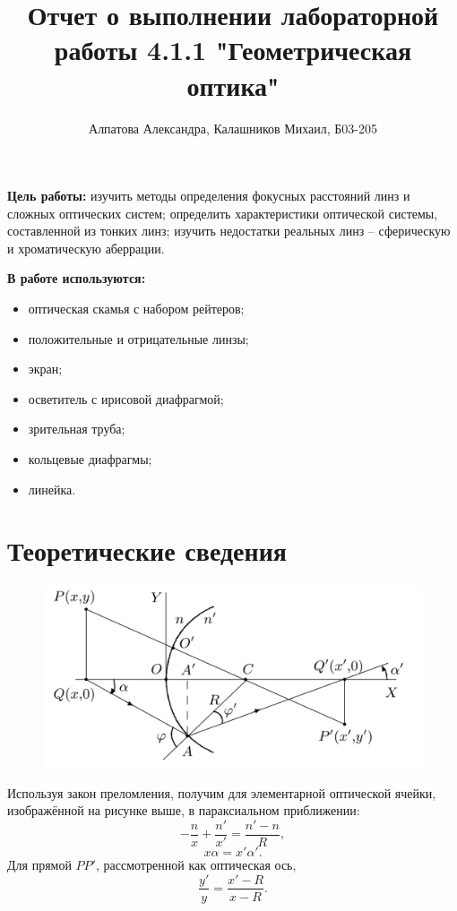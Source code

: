 \documentclass[14pt, a4paper]{report}
\title{\textbf{Отчет о выполнении лабораторной работы 4.1.1 "Геометрическая оптика"}}
\author{Алпатова Александра, Калашников Михаил, Б03-205}
\date{}
\begin{document}
\maketitle

\textbf{Цель работы:}
изучить методы определения фокусных расстояний линз и сложных оптических систем; определить характеристики оптической системы, составленной из тонких линз; изучить недостатки реальных линз -- сферическую и хроматическую аберрации.
\newline

\textbf{В работе используются:}
\begin{itemize}
\item оптическая скамья с набором рейтеров;
\item положительные и отрицательные линзы;
\item экран;
\item осветитель с ирисовой диафрагмой;
\item зрительная труба;
\item кольцевые диафрагмы;
\item линейка.
\end{itemize}

\section{Теоретические сведения}

\begin{figure}[H]
\centering
\includegraphics[width=0.8\linewidth]{../images/411_4}
\end{figure}

Используя закон преломления, получим для элементарной оптической ячейки, изображённой на рисунке выше, в параксиальном приближении:
\begin{equation}\label{опт-ячейка}
	-\frac{n}{x}+\frac{n'}{x'} = \frac{n'-n}{R},
\end{equation}
\begin{equation}
	x \alpha = x' \alpha'.
\end{equation}
Для прямой $ P P' $, рассмотренной как оптическая ось, 
\begin{equation}\label{PP}
	\frac{y'}{y} = \frac{x' - R}{x - R}.
\end{equation}
\end{document}
